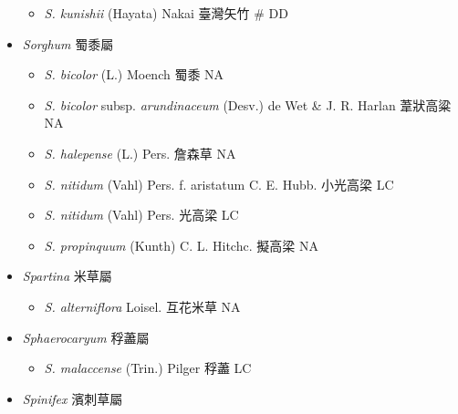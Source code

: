 \begin{itemize}
  \begin{itemize}
        \item[] \textit{S. kunishii} (Hayata) Nakai  臺灣矢竹  \# DD
  \end{itemize}
 \item[] \textit{Sorghum} 蜀黍屬
                                
  \begin{itemize}
        \item[] \textit{S. bicolor} (L.) Moench  蜀黍   NA
        \item[] \textit{S. bicolor} subsp. \textit{arundinaceum} (Desv.) de Wet \& J. R. Harlan  葦狀高粱   NA
        \item[] \textit{S. halepense} (L.) Pers.  詹森草   NA
        \item[] \textit{S. nitidum} (Vahl) Pers. f. aristatum C. E. Hubb.  小光高梁   LC
        \item[] \textit{S. nitidum} (Vahl) Pers.  光高梁   LC
        \item[] \textit{S. propinquum} (Kunth) C. L. Hitchc.  擬高梁   NA
  \end{itemize}
 \item[] \textit{Spartina} 米草屬
                                
  \begin{itemize}
        \item[] \textit{S. alterniflora} Loisel.  互花米草   NA
  \end{itemize}
 \item[] \textit{Sphaerocaryum} 稃藎屬
                                
  \begin{itemize}
        \item[] \textit{S. malaccense} (Trin.) Pilger  稃藎   LC
  \end{itemize}
 \item[] \textit{Spinifex} 濱刺草屬
                                

\end{itemize}
